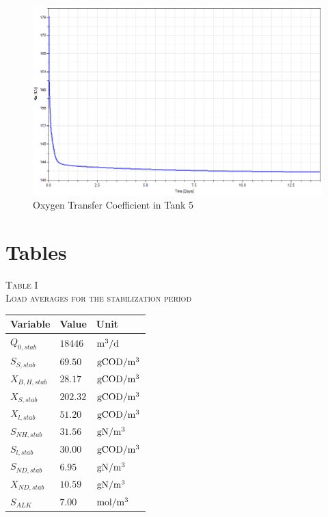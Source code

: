 \begin{figure}[h]
    \centering
    \includegraphics[width=1\textwidth]{Report/Figures/task2c.png}
    \caption{Oxygen Transfer Coefficient in Tank 5}
    \label{fig:KlaTank5}
\end{figure}

\newpage

\twocolumn
\section{Tables}
\label{sec:AppendixB}

\begin{table}[h]
\begin{center}
    \textsc{\small{Table I}} \\[0.3pt]
    \textsc{Load averages for the stabilization period}
\end{center}
\centering
\begin{tabular}{p{2.4cm} p{2.0cm} p{1.4cm}}
\hline
\bf{Variable}   & \bf{Value}  & \bf{Unit} \\
\hline
$Q_{0,stab}$   & $18446$  & $\unit[]{m^3/d}$ \\
$S_{S,stab}$   & $69.50$  & $\unit[]{gCOD/m^3}$ \\
$X_{B,H,stab}$ & $28.17$  & $\unit[]{gCOD/ m^{3}}$ \\
$X_{S,stab}$   & $202.32$ & $\unit[]{gCOD/m^{3}}$ \\
$X_{l,stab}$   & $51.20$  & $\unit[]{gCOD/ m^{3}}$ \\
$S_{NH,stab}$  & $31.56$  & $\unit[]{gN/ m^{3}}$ \\
$S_{l,stab}$   & $30.00$  & $\unit[]{gCOD/ m^{3}}$ \\
$S_{ND,stab}$  & $6.95$   & $\unit[]{gN/ m^{3}}$ \\
$X_{ND,stab}$  & $10.59$  & $\unit[]{gN/ m^{3}}$ \\
$S_{ALK}$      & $7.00$   & $\unit[]{mol/ m^{3}}$ \\
\hline
\end{tabular}
\label{tab:load-averages}
\end{table}

